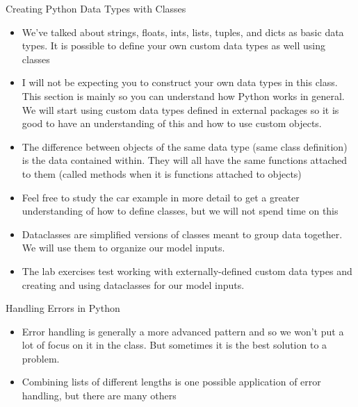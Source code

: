 \documentclass[]{article}
\begin{document}
\begin{section}{Creating Python Data Types with Classes}
\begin{itemize}
\item We've talked about strings, floats, ints, lists, tuples, and dicts as basic data types. It is possible to define your own custom data types as well using classes
\item I will not be expecting you to construct your own data types in this class. This section is mainly so you can understand how Python works in general. We will start using custom data types defined in external packages so it is good to have an understanding of this and how to use custom objects.
\item The difference between objects of the same data type (same class definition) is the data contained within. They will all have the same functions attached to them (called methods when it is functions attached to objects)
\item Feel free to study the car example in more detail to get a greater understanding of how to define classes, but we will not spend time on this
\item Dataclasses are simplified versions of classes meant to group data together. We will use them to organize our model inputs.
\item The lab exercises test working with externally-defined custom data types and creating and using dataclasses for our model inputs.
\end{itemize}
\end{section}
\begin{section}{Handling Errors in Python}
\begin{itemize}
\item Error handling is generally a more advanced pattern and so we won't put a lot of focus on it in the class. But sometimes it is the best solution to a problem.
\item Combining lists of different lengths is one possible application of error handling, but there are many others
\end{itemize}
\end{section}
\end{document}
